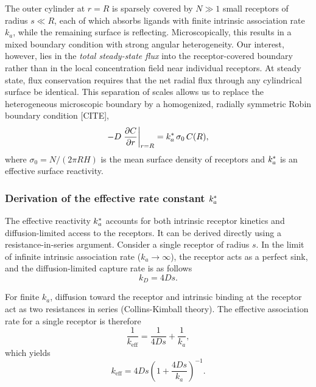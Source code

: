 The outer cylinder at $r = R$ is sparsely covered by $N \gg 1$ small receptors of radius $s \ll R$, each of which absorbs ligands with finite intrinsic association rate $k_a$, while the remaining surface is reflecting.
Microscopically, this results in a mixed boundary condition with strong angular heterogeneity.
Our interest, however, lies in the \textit{total steady-state flux} into the receptor-covered boundary rather than in the local concentration field near individual receptors.
At steady state, flux conservation requires that the net radial flux through any cylindrical surface be identical.
This separation of scales allows us to replace the heterogeneous microscopic boundary by a homogenized, radially symmetric Robin boundary condition [CITE],
\begin{equation}
    -D \left.\frac{\partial C}{\partial r}\right|_{r=R} = k_a^{*} \, \sigma_{0} \, C(R),
    \label{eq:robin_bc}
\end{equation}
where $\sigma_{0} = N/(2\pi R H)$ is the mean surface density of receptors and $k_a^{*}$ is an effective surface reactivity.

\subsubsection{Derivation of the effective rate constant \texorpdfstring{$k_a^{*}$}{ka*}}\label{sec:keff_derivation}
The effective reactivity $k_a^{*}$ accounts for both intrinsic receptor kinetics and diffusion-limited access to the receptors.
It can be derived directly using a resistance-in-series argument.
Consider a single receptor of radius $s$.
In the limit of infinite intrinsic association rate ($k_a \to \infty$), the receptor acts as a perfect sink,
and the diffusion-limited capture rate is as follows
\begin{equation}
    k_{D} = 4 D s.
    \label{eq:kD}
\end{equation}

For finite $k_a$, diffusion toward the receptor and intrinsic binding at the receptor act as two resistances in series (Collins-Kimball theory).
The effective association rate for a single receptor is therefore
\begin{equation}
    \frac{1}{k_{\mathrm{eff}}} = \frac{1}{4Ds} + \frac{1}{k_a},
    \label{eq:keff_series}
\end{equation}
which yields
\begin{equation}
    k_{\mathrm{eff}} = 4Ds \left(1 + \frac{4Ds}{k_a}\right)^{-1}.
    \label{eq:keff_result}
\end{equation}


